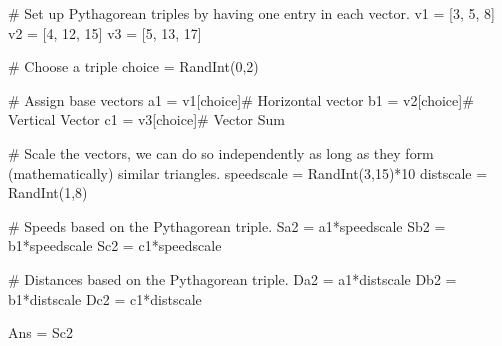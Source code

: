 



\begin{sagesilent}

# Set up Pythagorean triples by having one entry in each vector.
v1 = [3, 5, 8]
v2 = [4, 12, 15]
v3 = [5, 13, 17]

# Choose a triple
choice = RandInt(0,2)

# Assign base vectors
a1 = v1[choice]# Horizontal vector
b1 = v2[choice]# Vertical Vector
c1 = v3[choice]# Vector Sum

# Scale the vectors, we can do so independently as long as they form (mathematically) similar triangles.
speedscale = RandInt(3,15)*10
distscale = RandInt(1,8)

# Speeds based on the Pythagorean triple.
Sa2 = a1*speedscale
Sb2 = b1*speedscale
Sc2 = c1*speedscale

# Distances based on the Pythagorean triple.
Da2 = a1*distscale
Db2 = b1*distscale
Dc2 = c1*distscale

Ans = Sc2
\end{sagesilent}



